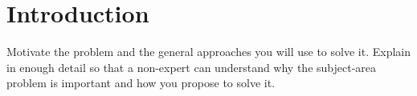 \section{Introduction}
\label{sec:intro}
Motivate the problem and the general approaches you will use to solve it. Explain in enough detail so that a non-expert can understand why the subject-area problem is important and how you propose to solve it.

